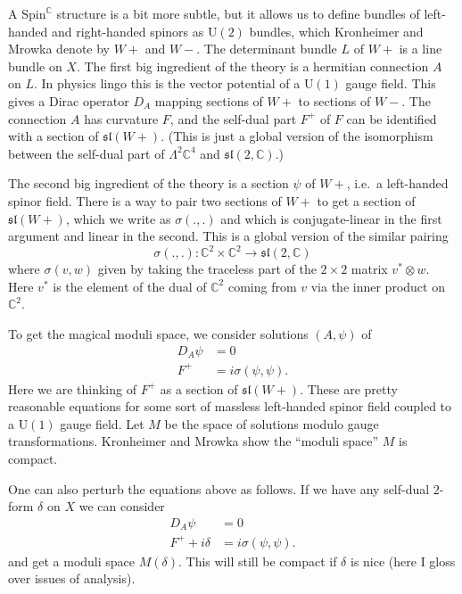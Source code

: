 \documentclass{article}
\begin{document}
A $\mathrm{Spin}^\mathbb{C}$ structure is a bit more subtle, but it allows us to define
bundles of left-handed and right-handed spinors as \(\mathrm{U}(2)\)
bundles, which Kronheimer and Mrowka denote by \(W+\) and \(W-\). The
determinant bundle \(L\) of \(W+\) is a line bundle on \(X\). The first
big ingredient of the theory is a hermitian connection \(A\) on \(L\).
In physics lingo this is the vector potential of a \(\mathrm{U}(1)\)
gauge field. This gives a Dirac operator \(D_A\) mapping sections of
\(W+\) to sections of \(W-\). The connection \(A\) has curvature \(F\),
and the self-dual part \(F^+\) of \(F\) can be identified with a section
of \(\mathfrak{sl}(W+)\). (This is just a global version of the
isomorphism between the self-dual part of \(\Lambda^2 \mathbb{C}^4\) and
\(\mathfrak{sl}(2,\mathbb{C})\).)

The second big ingredient of the theory is a section \(\psi\) of \(W+\),
i.e.~a left-handed spinor field. There is a way to pair two sections of
\(W+\) to get a section of \(\mathfrak{sl}(W+)\), which we write as
\(\sigma(.,.)\) and which is conjugate-linear in the first argument and
linear in the second. This is a global version of the similar pairing
\[\sigma(.,.)\colon \mathbb{C}^2 \times \mathbb{C}^2 \to \mathfrak{sl}(2,\mathbb{C})\]
where \(\sigma(v,w)\) given by taking the traceless part of the
\(2\times2\) matrix \(v^* \otimes w\). Here \(v^*\) is the element of
the dual of \(\mathbb{C}^2\) coming from \(v\) via the inner product on
\(\mathbb{C}^2\).

To get the magical moduli space, we consider solutions \((A,\psi)\) of
\[\begin{aligned}D_A\psi &= 0 \\ F^+ &= i\sigma(\psi,\psi).\end{aligned}\]
Here we are thinking of \(F^+\) as a section of \(\mathfrak{sl}(W+)\).
These are pretty reasonable equations for some sort of massless
left-handed spinor field coupled to a \(\mathrm{U}(1)\) gauge field. Let
\(M\) be the space of solutions modulo gauge transformations. Kronheimer
and Mrowka show the ``moduli space'' \(M\) is compact.

One can also perturb the equations above as follows. If we have any
self-dual \(2\)-form \(\delta\) on \(X\) we can consider
\[\begin{aligned}D_A\psi &= 0 \\ F^+ +i\delta &= i\sigma(\psi,\psi).\end{aligned}\]
and get a moduli space \(M(\delta)\). This will still be compact if
\(\delta\) is nice (here I gloss over issues of analysis).
\end{document}
